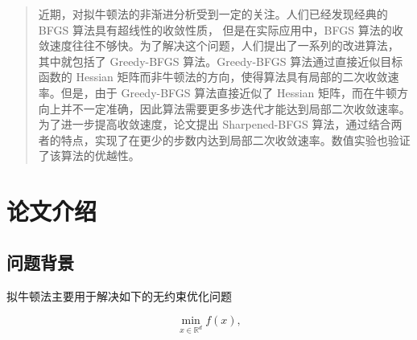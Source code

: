 \documentclass[a4paper,twoside,AutoFakeBold]{article}
\theoremstyle{definition}
\begin{document}

\maketitle
\thispagestyle{empty} \cleardoublepage

\rptcontent \thispagestyle{empty} \cleardoublepage

\begin{abstract}\kaiti \xiaosi
近期，对拟牛顿法的非渐进分析受到一定的关注。人们已经发现经典的 BFGS 算法具有超线性的收敛性质，
但是在实际应用中，BFGS 算法的收敛速度往往不够快。为了解决这个问题，人们提出了一系列的改进算法，
其中就包括了 Greedy-BFGS 算法。Greedy-BFGS 算法通过直接近似目标函数的 Hessian 矩阵而非牛顿法的方向，使得算法具有局部的二次收敛速率。但是，由于 Greedy-BFGS 算法直接近似了 Hessian 矩阵，而在牛顿方向上并不一定准确，因此算法需要更多步迭代才能达到局部二次收敛速率。为了进一步提高收敛速度，论文提出 Sharpened-BFGS 算法，通过结合两者的特点，实现了在更少的步数内达到局部二次收敛速率。数值实验也验证了该算法的优越性。
\end{abstract}
\cleardoublepage

\songti\xiaosi
%
\section{论文介绍}
\subsection{问题背景}
拟牛顿法主要用于解决如下的无约束优化问题

\begin{equation}\label{main_prob}
    \min_{x \in \mathbb{R}^d} f(x),
\end{equation}
\end{document}
